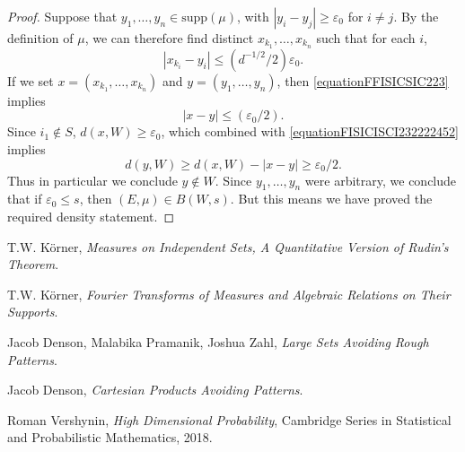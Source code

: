 \documentclass[12pt,reqno]{article}
\numberwithin{equation}{section}
\begin{document}
\begin{proof}
    Suppose that $y_1, \dots, y_n \in \text{supp}(\mu)$, with $|y_i - y_j| \geq \varepsilon_0$ for $i \neq j$. By the definition of $\mu$, we can therefore find distinct $x_{k_1}, \dots, x_{k_n}$ such that for each $i$,
    \begin{equation} \label{equationFFISICSIC223}
        |x_{k_i} - y_i| \leq (d^{-1/2}/2) \varepsilon_0.
    \end{equation}
    If we set $x = (x_{k_1}, \dots, x_{k_n})$ and $y = (y_1, \dots, y_n)$, then \eqref{equationFFISICSIC223} implies
    \begin{equation} \label{equationFISICISCI232222452}
        |x - y| \leq (\varepsilon_0/2).
    \end{equation}
    Since $i_1 \not \in S$, $d(x,W) \geq \varepsilon_0$, which combined with \eqref{equationFISICISCI232222452} implies
    \begin{equation} \label{equationSICSICI}
        d(y,W) \geq d(x,W) - |x - y| \geq \varepsilon_0/2.
    \end{equation}
    Thus in particular we conclude $y \not \in W$. Since $y_1, \dots, y_n$ were arbitrary, we conclude that if $\varepsilon_0 \leq s$, then $(E,\mu) \in B(W,s)$. But this means we have proved the required density statement.
\end{proof}

\begin{thebibliography}{9}

    T.W. K\"{o}rner,
    \textit{Measures on Independent Sets, A Quantitative Version of Rudin's Theorem}.

    T.W. K\"{o}rner,
    \textit{Fourier Transforms of Measures and Algebraic Relations on Their Supports}.

    Jacob Denson, Malabika Pramanik, Joshua Zahl,
    \textit{Large Sets Avoiding Rough Patterns}.

    Jacob Denson,
    \textit{Cartesian Products Avoiding Patterns}.

    Roman Vershynin,
    \textit{High Dimensional Probability},
    Cambridge Series in Statistical and Probabilistic Mathematics,
    2018.

\end{thebibliography}
\end{document}
